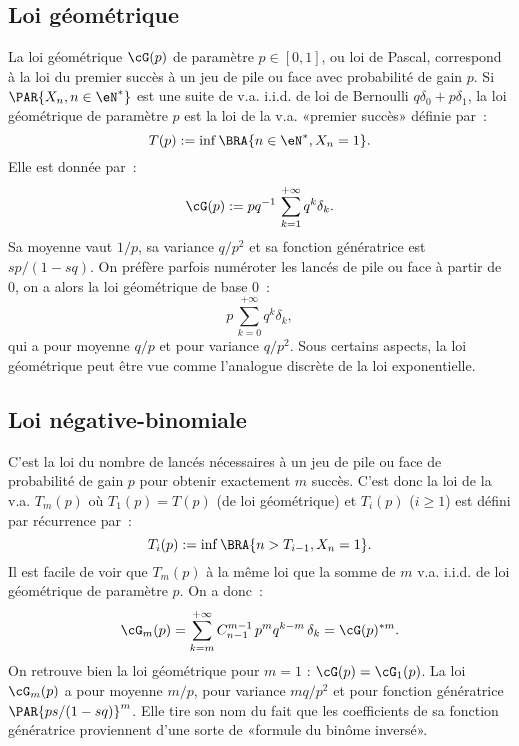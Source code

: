 %
\subsection{Loi géométrique}\label{ss:loi:geometrique}
%

La loi géométrique $\cG(p)$ de paramètre $p\in[0,1]$, ou loi de Pascal,
correspond à la loi du premier succès à un jeu de pile ou face avec
probabilité de gain $p$. Si $\PAR{X_n,n\in\eN^*}$ est une suite de v.a. i.i.d.
de loi de Bernoulli $q\delta_0+p\delta_1$, la loi géométrique de paramètre $p$ est
la loi de la v.a. «premier succès» définie par~:
$$
T(p):=\inf\BRA{n\in\eN^*, X_n=1}.
$$
Elle est donnée par~:
$$
\cG(p):=pq^{-1}\,\sum_{k=1}^{+\infty} q^k\delta_k.
$$
Sa moyenne vaut $1/p$, sa variance $q/p^2$ et sa fonction génératrice est
$sp/(1-sq)$. On préfère parfois numéroter les lancés de pile ou face à partir
de $0$, on a alors la loi géométrique de base $0$~:
$$
p\,\sum_{k=0}^{+\infty} q^k\delta_k,
$$
qui a pour moyenne $q/p$ et pour variance $q/p^2$.
Sous certains aspects, la loi géométrique peut être vue
comme l'analogue discrète de la loi exponentielle. 

%
\subsection{Loi négative-binomiale}\label{ss:loi:negative-binomiale}
%

C'est la loi du nombre de lancés nécessaires à un jeu de pile ou face de
probabilité de gain $p$ pour obtenir exactement $m$ succès.  C'est donc la loi
de la v.a. $T_m(p)$ où $T_1(p)=T(p)$ (de loi géométrique) et $T_i(p)$ ($i\geq 1$) est
défini par récurrence par~:
$$
T_i(p):=\inf\BRA{n>T_{i-1}, X_n=1}.
$$
Il est facile de voir que $T_m(p)$ à la même loi que la somme de $m$ v.a.
i.i.d. de loi géométrique de paramètre $p$. On a donc~:
$$
\cG_m(p)= \sum_{k=m}^{+\infty} C_{n-1}^{m-1}\,p^m q^{k-m} \,\delta_k
= \cG(p)^{*m}.
$$
On retrouve bien la loi géométrique pour $m=1$ : $\cG(p)=\cG_1(p)$. La loi
$\cG_m(p)$ a pour moyenne $m/p$, pour variance $mq/p^2$ et pour fonction
génératrice $\PAR{ps/(1-sq)}^m$. Elle tire son nom du fait que les
coefficients de sa fonction génératrice proviennent d'une sorte de «formule du
binôme inversé».

